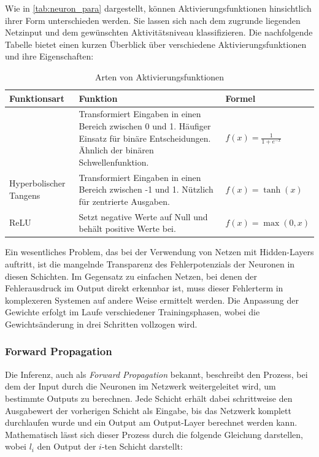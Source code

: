 \documentclass[a4paper, 12pt]{article}
\begin{document}
Wie in \autoref{tab:neuron_para} dargestellt, können Aktivierungsfunktionen hinsichtlich ihrer Form 
unterschieden werden. Sie lassen sich nach dem zugrunde liegenden Netzinput und dem gewünschten 
Aktivitätsniveau klassifizieren. Die nachfolgende Tabelle bietet einen kurzen Überblick über 
verschiedene Aktivierungsfunktionen und ihre Eigenschaften:

\begin{table}[h!]
	\centering
	\begin{tabular}{|>{\centering\arraybackslash}m{2.8cm}|>{\raggedright\arraybackslash}m{6.5cm}|>{\centering\arraybackslash}m{2.8cm}|}
	\hline
	\textbf{Funktionsart} & \textbf{Funktion} & \textbf{Formel} \\ \hline
	{Sigmoid} & Transformiert Eingaben in einen Bereich zwischen 0 und 1. Häufiger Einsatz für binäre Entscheidungen. Ähnlich der binären Schwellenfunktion. & \(f(x) = \frac{1}{1 + e^{-x}}\) \\ \hline
	{Hyperbolischer Tangens} & \vspace{0.2cm}Transformiert Eingaben in einen Bereich zwischen -1 und 1. Nützlich für zentrierte Ausgaben.\vspace{0.2cm} & \(f(x) = \tanh(x)\) \\ \hline
	{ReLU} & \vspace{0.2cm}Setzt negative Werte auf Null und behält positive Werte bei.\vspace{0.2cm} & \(f(x) = \max(0, x)\) \\ \hline
	\end{tabular}
	\caption{Arten von Aktivierungsfunktionen}
	\label{tab:Aktivierungsfunktion}
\end{table}

Ein wesentliches Problem, das bei der Verwendung von Netzen mit Hidden-Layers auftritt, ist die 
mangelnde Transparenz des Fehlerpotenzials der Neuronen in diesen Schichten. Im Gegensatz zu 
einfachen Netzen, bei denen der Fehlerausdruck im Output direkt erkennbar ist, muss dieser Fehlerterm 
in komplexeren Systemen auf andere Weise ermittelt werden. Die Anpassung der Gewichte erfolgt im 
Laufe verschiedener Trainingsphasen, wobei die Gewichtsänderung in drei Schritten vollzogen wird.

\subsubsection{Forward Propagation}\label{chapter..2.3.1}
Die Inferenz, auch als \textit{Forward Propagation} bekannt, beschreibt den Prozess, bei dem der 
Input durch die Neuronen im Netzwerk weitergeleitet wird, um bestimmte Outputs zu berechnen. Jede 
Schicht erhält dabei schrittweise den Ausgabewert der vorherigen Schicht als Eingabe, bis das 
Netzwerk komplett durchlaufen wurde und ein Output am Output-Layer berechnet werden kann. 
Mathematisch lässt sich dieser Prozess durch die folgende Gleichung darstellen, wobei $l_i$ den 
Output der $i$-ten Schicht darstellt:
\end{document}
